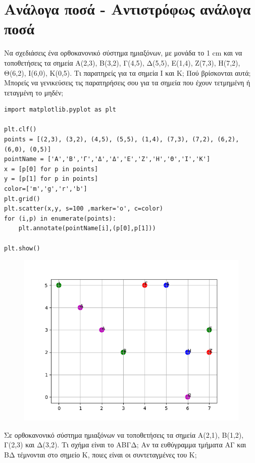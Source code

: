 \chapter{Ανάλογα ποσά - Αντιστρόφως ανάλογα ποσά}
\begin{exercise}
Να σχεδιάσεις ένα ορθοκανονικό σύστημα ημιαξόνων, με μονάδα το 1 cm και να
τοποθετήσεις τα σημεία Α(2,3), Β(3,2), Γ(4,5), Δ(5,5), Ε(1,4), Z(7,3), Η(7,2), Θ(6,2),
Ι(6,0), Κ(0,5). Τι παρατηρείς για τα σημεία Ι και Κ; Πού βρίσκονται αυτά; Μπορείς να
γενικεύσεις τις παρατηρήσεις σου για τα σημεία που έχουν τετμημένη ή τεταγμένη το
μηδέν;
\end{exercise}
\begin{lstlisting}
import matplotlib.pyplot as plt

plt.clf()
points = [(2,3), (3,2), (4,5), (5,5), (1,4), (7,3), (7,2), (6,2), (6,0), (0,5)]
pointName = ['Α','Β','Γ','Δ','Δ','Ε','Ζ','Η','Θ','Ι','Κ']
x = [p[0] for p in points]
y = [p[1] for p in points]
color=['m','g','r','b']
plt.grid()
plt.scatter(x,y, s=100 ,marker='o', c=color)
for (i,p) in enumerate(points):
    plt.annotate(pointName[i],(p[0],p[1]))

plt.show()
\end{lstlisting}
\begin{figure}
\includegraphics{graph1.png}
\end{figure}
\begin{exercise}
Σε ορθοκανονικό σύστημα ημιαξόνων να τοποθετήσεις τα σημεία Α(2,1), Β(1,2), Γ(2,3)
και Δ(3,2). Τι σχήμα είναι το ΑΒΓΔ; Αν τα ευθύγραμμα τμήματα ΑΓ και ΒΔ τέμνονται
στο σημείο Κ, ποιες είναι οι συντεταγμένες του Κ;
\end{exercise}
